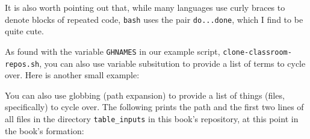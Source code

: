 \documentclass[]{krantz}
\makeatletter
\newenvironment{Shaded}{\begin{snugshade}}{\end{snugshade}}
\newcommand{\BuiltInTok}[1]{#1}
\newcommand{\ExtensionTok}[1]{#1}
\newcommand{\FunctionTok}[1]{\textcolor[rgb]{0,0,0}{#1}}
\newcommand{\KeywordTok}[1]{\textcolor[rgb]{0.27,0.27,0.27}{\textbf{#1}}}
\newcommand{\NormalTok}[1]{#1}
\newcommand{\StringTok}[1]{\textcolor[rgb]{0.5,0.5,0.5}{#1}}
\newcommand{\VariableTok}[1]{\textcolor[rgb]{0,0,0}{#1}}
\newenvironment{kframe}{%
\medskip{}
\setlength{\fboxsep}{.8em}
 \def\at@end@of@kframe{}%
 \ifinner\ifhmode%
  \def\at@end@of@kframe{\end{minipage}}%
  \begin{minipage}{\columnwidth}%
 \fi\fi%
 \def\FrameCommand##1{\hskip\@totalleftmargin \hskip-\fboxsep
 \colorbox{shadecolor}{##1}\hskip-\fboxsep
     \hskip-\linewidth \hskip-\@totalleftmargin \hskip\columnwidth}%
 \MakeFramed {\advance\hsize-\width
   \@totalleftmargin\z@ \linewidth\hsize
   \@setminipage}}%
 {\par\unskip\endMakeFramed%
 \at@end@of@kframe}
\renewenvironment{Shaded}{\begin{kframe}}{\end{kframe}}
\makeatother
\begin{document}
\begin{Shaded}
\end{Shaded}

It is also worth pointing out that, while many languages use curly braces to denote
blocks of repeated code, \texttt{bash} uses the pair \texttt{do...done}, which I find to be quite cute.

As found with the variable \texttt{GHNAMES} in our example script,
\texttt{clone-classroom-repos.sh}, you can also use variable
subsitution to provide a list of terms to cycle over. Here is
another small example:

\begin{Shaded}
\end{Shaded}

You can also use globbing (path expansion) to provide a list of
things (files, specifically) to cycle over. The following prints the path
and the first two
lines of all files in the directory \texttt{table\_inputs} in this book's repository,
at this point in the book's formation:
\end{document}
